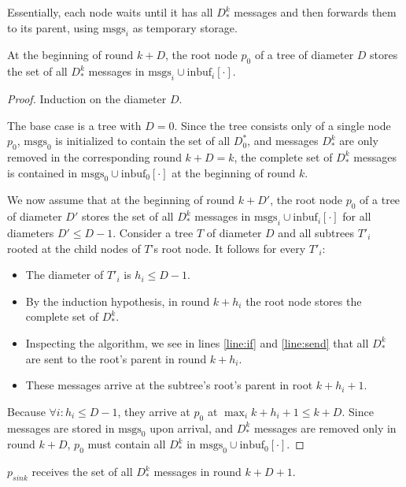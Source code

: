 Essentially, each node waits until it has all $D_*^k$ messages and
then forwards them to its parent, using $\text{msgs}_i$ as temporary storage.

\begin{lemma} \label{lem:tpipe}
At the beginning of round $k + D$, the root node $p_0$ of a tree of diameter $D$
stores the set of all $D_*^k$ messages in $\text{msgs}_i \cup \text{inbuf}_i[\cdot]$.
\end{lemma}

\begin{proof}
Induction on the diameter $D$.

The base case is a tree with $D = 0$. Since the tree consists only of a single node $p_0$,
$\text{msgs}_0$ is initialized to contain the set of all $D_0^*$, 
and messages $D_*^k$ are only removed in the corresponding round $k + D = k$, 
the complete set of $D_*^k$ messages is contained in 
$\text{msgs}_0 \cup \text{inbuf}_0[\cdot]$ at the beginning of round $k$.

We now assume that at the beginning of round $k + D'$, the root node $p_0$ of a 
tree of diameter $D'$ stores the set of all $D_*^k$ messages in 
$\text{msgs}_i \cup \text{inbuf}_i[\cdot]$ for all diameters $D' \leq D - 1$.
Consider a tree $T$ of diameter $D$ and all subtrees $T'_i$ rooted at
the child nodes of $T$'s root node. It follows for every $T'_i$:

\begin{itemize}
\item The diameter of $T'_i$ is $h_i \leq D - 1$.
\item By the induction hypothesis, in round $k + h_i$ the root node stores
      the complete set of $D_*^k$.
\item Inspecting the algorithm, we see in lines \ref{line:if} and \ref{line:send}
      that all $D_*^k$ are sent to the root's parent in round $k + h_i$.
\item These messages arrive at the subtree's root's parent in root $k + h_i + 1$.
\end{itemize}

Because $\forall i: h_i \leq D - 1$, they arrive at $p_0$ at 
$\max_i k + h_i + 1 \leq k + D$. Since messages are stored in $\text{msgs}_0$
upon arrival, and $D_*^k$ messages are removed only in round $k + D$,
$p_0$ must contain all $D_*^k$ in $\text{msgs}_0 \cup \text{inbuf}_0[\cdot]$.
\end{proof}

\begin{theorem}
$p_{sink}$ receives the set of all $D_*^k$ messages in round $k + D + 1$.
\end{theorem}

